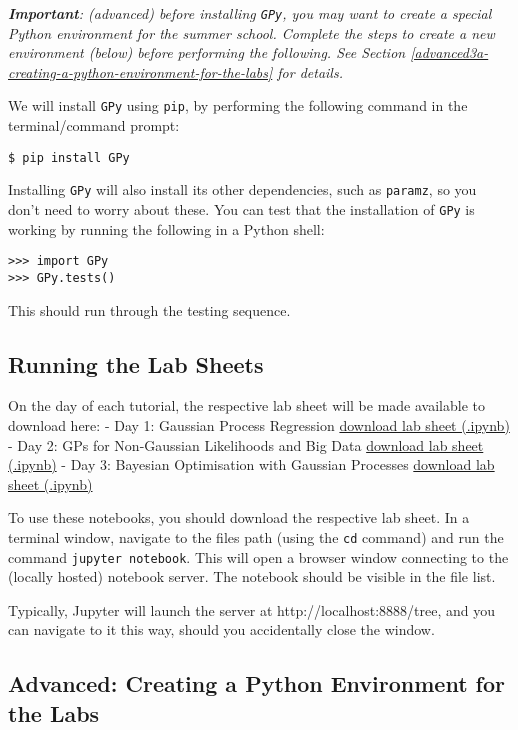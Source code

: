 \documentclass[11pt]{article}
\begin{document}
\emph{\textbf{Important}: (advanced) before installing \texttt{GPy}, you
may want to create a special Python environment for the summer school.
Complete the steps to create a new environment (below) before performing
the following. See
Section \ref{advanced3a-creating-a-python-environment-for-the-labs} for
details.}

We will install \texttt{GPy} using \texttt{pip}, by performing the
following command in the terminal/command prompt:

\texttt{\$\ pip\ install\ GPy}

Installing \texttt{GPy} will also install its other dependencies, such
as \texttt{paramz}, so you don't need to worry about these. You can test
that the installation of \texttt{GPy} is working by running the
following in a Python shell:

\begin{verbatim}
>>> import GPy
>>> GPy.tests()
\end{verbatim}

This should run through the testing sequence.

    \hypertarget{running-the-lab-sheets}{%
\subsection{Running the Lab Sheets}\label{running-the-lab-sheets}}

    On the day of each tutorial, the respective lab sheet will be made
available to download here: - Day 1: Gaussian Process Regression
\href{/path/to/lab}{download lab sheet (.ipynb)} - Day 2: GPs for
Non-Gaussian Likelihoods and Big Data \href{/path/to/lab}{download lab
sheet (.ipynb)} - Day 3: Bayesian Optimisation with Gaussian Processes
\href{/path/to/lab}{download lab sheet (.ipynb)}

To use these notebooks, you should download the respective lab sheet. In
a terminal window, navigate to the files path (using the \texttt{cd}
command) and run the command \texttt{jupyter\ notebook}. This will open
a browser window connecting to the (locally hosted) notebook server. The
notebook should be visible in the file list.

Typically, Jupyter will launch the server at http://localhost:8888/tree,
and you can navigate to it this way, should you accidentally close the
window.

    \hypertarget{advanced-creating-a-python-environment-for-the-labs}{%
\subsection{Advanced: Creating a Python Environment for the
Labs}\label{advanced-creating-a-python-environment-for-the-labs}}
\end{document}
